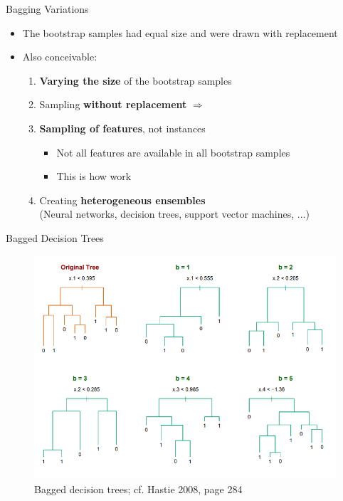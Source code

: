 \begin{frame}{Bagging Variations}{}
	\begin{itemize}
		\item The bootstrap samples had equal size and were drawn with replacement
		\item Also conceivable:
		\begin{enumerate}
			\item \textbf{Varying the size} of the bootstrap samples
			\item Sampling \textbf{without replacement} $\Rightarrow$ 
			\item \textbf{Sampling of features}, not instances
			\begin{itemize}
				\item Not all features are available in all bootstrap samples
				\item This is how  work
			\end{itemize}
			\item Creating \textbf{heterogeneous ensembles} \\
				(Neural networks, decision trees, support vector machines, ...)
		\end{enumerate}
	\end{itemize}
\end{frame}


\begin{frame}{Bagged Decision Trees}{}
	\begin{figure}
		\includegraphics[scale=0.35]{08_decision_trees/02_img/bagged_decision_trees}
		\vspace*{-4mm}
		\caption{Bagged decision trees; cf. Hastie 2008, page 284}
	\end{figure}
\end{frame}


